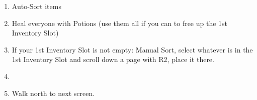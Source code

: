 \begin{enumerate}[resume]
    \item Auto-Sort items
    \item Heal everyone with Potions (use them all if you can to free up the 1st Inventory Slot)
    \item If your 1st Inventory Slot is not empty: Manual Sort, select whatever is in the 1st Inventory Slot and scroll down a page with R2, place it there.
    \item \formation{\tidus}{\wakka}{\auron}
    \item Walk north to next screen.
\end{enumerate}